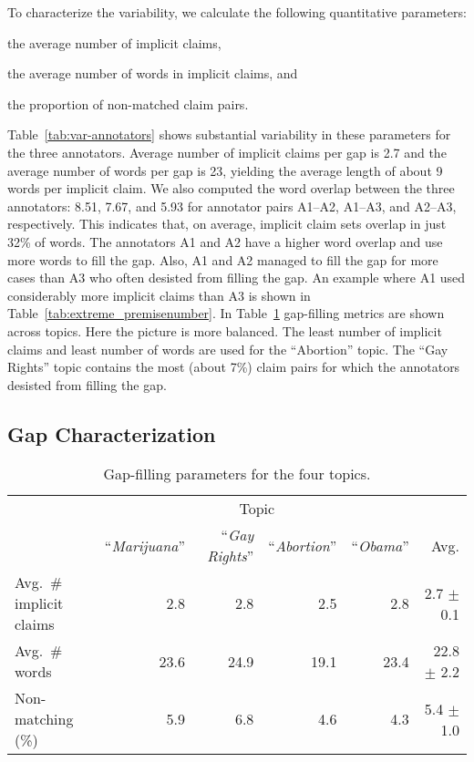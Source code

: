 To characterize the variability, we calculate the following quantitative parameters:
\begin{enumerate*}[label=(\arabic*)]
\item the average number of implicit claims, 
\item the average number of words in implicit claims, and
\item the proportion of non-matched claim pairs.
\end{enumerate*}
Table~\ref{tab:var-annotators} shows substantial variability in these parameters for the three
annotators. 
Average number of implicit claims per gap is 2.7 and the average number of words per gap is 23, 
yielding the average length of about 9 words per implicit claim. 
We also computed the word overlap between the three annotators: 8.51, 7.67, and 5.93 
for annotator pairs A1--A2, A1--A3, and A2--A3, respectively. 
This indicates that, on average, implicit claim sets overlap in just 32\% of words. 
The annotators A1 and A2 have a higher word overlap and use more words to fill the gap. 
Also, A1 and A2 managed to fill the gap for more cases than A3 who 
often desisted from filling the gap. 
An example where A1 used considerably more implicit claims than A3 is shown in 
Table~\ref{tab:extreme_premisenumber}. 
In Table~\ref{tab:var-topics} gap-filling metrics are shown across topics. 
Here the picture is more balanced. 
The least number of implicit claims and least number of words are used for the
``Abortion'' topic. The ``Gay Rights'' topic contains the most (about 7\%)
claim pairs for which the annotators desisted from filling the gap. 

\subsection{Gap Characterization}

\begin{table}
{
\begin{center}
\setlength{\tabcolsep}{4.2pt}
\begin{tabular}{@{}lrrrrr@{}}
\toprule
&\multicolumn{4}{c}{Topic}\\
\cmidrule(lr){2-5}
& ``\emph{Marijuana}'' & ``\emph{Gay Rights}'' & ``\emph{Abortion}'' & ``\emph{Obama}'' & Avg. \\
\midrule
Avg.~\#\,implicit claims  & 2.8  & 2.8   & 2.5   &  2.8  &  \phantom{0}2.7 $\pm$ 0.1 \\
Avg.~\#\,words     & 23.6  & 24.9   & 19.1   &  23.4  & 22.8 $\pm$ 2.2\\
Non-matching (\%)     & 5.9  & 6.8   & 4.6   &  4.3  &  \phantom{0}5.4 $\pm$ 1.0\\
\bottomrule
\end{tabular}
\caption{Gap-filling parameters for the four topics.}
\label{tab:var-topics}
\end{center}}
\end{table}

